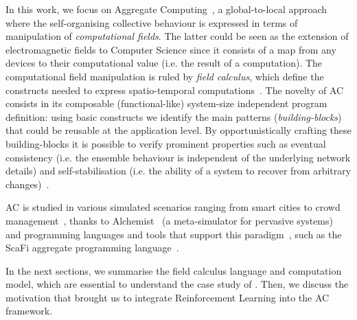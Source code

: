 \documentclass[conference]{IEEEtran}
\begin{document}
In this work, we focus on Aggregate Computing~\cite{DBLP:journals/computer/BealPV15}, a global-to-local approach where
 the self-organising collective behaviour is expressed in terms of manipulation of \textit{computational fields}.
The latter could be seen as the extension of electromagnetic fields to Computer Science since it consists of a 
 map from any devices to their computational value (i.e. the result of a computation).
The computational field manipulation is ruled by \textit{field calculus}, which define the constructs needed 
 to express spatio-temporal computations~\cite{DBLP:journals/jlap/ViroliBDACP19}.
%
The novelty of AC consists in its composable (functional-like) system-size independent program definition: 
 using basic constructs we identify the main patterns (\textit{building-blocks}) that could be reusable at the application level.
By opportunistically crafting these building-blocks it is possible to verify prominent properties such as eventual consistency %
 (i.e. the ensemble behaviour is independent of the underlying network details)
 and self-stabilisation %
 (i.e. the ability of a system to recover from arbitrary changes)~\cite{DBLP:journals/jlap/ViroliBDACP19}.

AC is studied in various simulated scenarios ranging from smart cities to crowd management~\cite{DBLP:journals/jlap/ViroliBDACP19}, 
 thanks to Alchemist~\cite{DBLP:journals/jos/PianiniMV13} (a meta-simulator for pervasive systems) and programming languages and tools that support 
 this paradigm~\cite{DBLP:journals/jlap/ViroliBDACP19}, such as the ScaFi aggregate programming language~\cite{DBLP:conf/isola/CasadeiVAD20}. %

In the next sections, we summarise the field calculus language and computation model, which are essential to understand the case study of .
Then, we discuss the motivation that brought us to integrate Reinforcement Learning into the AC framework.
 
\end{document}
